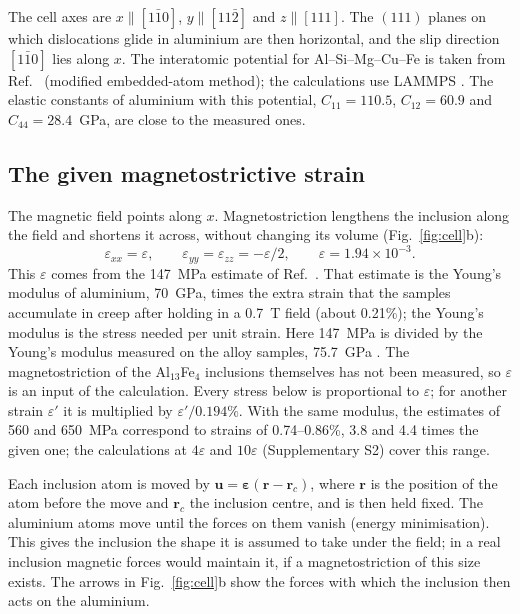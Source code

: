 \documentclass[11pt,a4paper]{article}
\begin{document}
The cell axes are $x\parallel[1\bar10]$, $y\parallel[11\bar2]$ and
$z\parallel[111]$. The $(111)$ planes on which dislocations glide in
aluminium are then horizontal, and the slip direction $[1\bar10]$ lies along
$x$. The interatomic potential for Al--Si--Mg--Cu--Fe is taken from
Ref.~\cite{Jelinek2012} (modified embedded-atom method); the calculations use
LAMMPS \cite{Thompson2022LAMMPS}. The elastic constants of aluminium with
this potential, $C_{11}=110.5$, $C_{12}=60.9$ and $C_{44}=28.4$~GPa, are close
to the measured ones.

\subsection{The given magnetostrictive strain}
\label{sec:strain}

The magnetic field points along $x$. Magnetostriction lengthens the inclusion
along the field and shortens it across, without changing its volume
(Fig.~\ref{fig:cell}b):
\begin{equation}
\varepsilon_{xx}=\varepsilon,\qquad
\varepsilon_{yy}=\varepsilon_{zz}=-\varepsilon/2,\qquad
\varepsilon=1.94\times10^{-3}.
\label{eq:strain}
\end{equation}
This $\varepsilon$ comes from the 147~MPa estimate of Ref.~\cite{Friha2024JMMM}.
That estimate is the Young's modulus of aluminium, 70~GPa, times the extra
strain that the samples accumulate in creep after holding in a 0.7~T field
(about 0.21\%); the Young's modulus is the stress needed per unit strain.
Here 147~MPa is divided by the Young's modulus measured on the alloy
samples, 75.7~GPa \cite{Pshonkin2025ZL}. The magnetostriction of the
Al$_{13}$Fe$_4$ inclusions themselves has not been measured, so
$\varepsilon$ is an input of the calculation. Every stress below is
proportional to $\varepsilon$; for another strain $\varepsilon'$ it is
multiplied by $\varepsilon'/0.194\%$. With the same modulus, the estimates
of 560 and 650~MPa \cite{Skvortsov2019JAP,Friha2023PSS} correspond to
strains of 0.74--0.86\%, 3.8 and 4.4 times the given one; the calculations at
$4\varepsilon$ and $10\varepsilon$ (Supplementary S2) cover this range.

Each inclusion atom is moved by
$\mathbf u=\boldsymbol\varepsilon(\mathbf r-\mathbf r_c)$, where $\mathbf r$ is
the position of the atom before the move and $\mathbf r_c$ the inclusion
centre, and is then held fixed. The aluminium atoms move until the forces on
them vanish (energy minimisation). This gives the inclusion the shape it is
assumed to take under the field; in a real inclusion magnetic forces would
maintain it, if a magnetostriction of this size exists. The arrows in
Fig.~\ref{fig:cell}b show the forces with which the inclusion then acts on
the aluminium.
\end{document}
